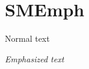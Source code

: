 \documentclass[class=scrartcl,crop=false]{standalone}
\begin{document}
\section{SMEmph}

Normal text

\emph{Emphasized text}

\end{document}
